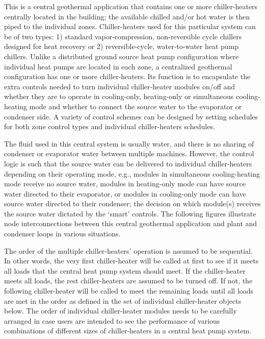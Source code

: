 This is a central geothermal application that contains one or more chiller-heaters centrally located in the building; the available chilled and/or hot water is then piped to the individual zones. Chiller-heaters used for this particular system can be of two types: 1) standard vapor-compression, non-reversible cycle chillers designed for heat recovery or 2) reversible-cycle, water-to-water heat pump chillers. Unlike a distributed ground source heat pump configuration where individual heat pumps are located in each zone, a centralized geothermal configuration has one or more chiller-heaters. Its function is to encapsulate the extra controls needed to turn individual chiller-heater modules on/off and whether they are to operate in cooling-only, heating-only or simultaneous cooling-heating mode and whether to connect the source water to the evaporator or condenser side. A variety of control schemes can be designed by setting schedules for both zone control types and individual chiller-heaters schedules.

The fluid used in this central system is usually water, and there is no sharing of condenser or evaporator water between multiple machines. However, the control logic is such that the source water can be delivered to individual chiller-heaters depending on their operating mode, e.g., modules in simultaneous cooling-heating mode receive no source water, modules in heating-only mode can have source water directed to their evaporator, or modules in cooling-only mode can have source water directed to their condenser; the decision on which module(s) receives the source water dictated by the `smart' controls. The following figures illustrate node interconnections between this central geothermal application and plant and condenser loops in various situations.

The order of the multiple chiller-heaters' operation is assumed to be sequential. In other words, the very first chiller-heater will be called at first to see if it meets all loads that the central heat pump system should meet. If the chiller-heater meets all loads, the rest chiller-heaters are assumed to be turned off. If not, the following chiller-heater will be called to meet the remaining loads until all loads are met in the order as defined in the set of individual chiller-heater objects below. The order of individual chiller-heater modules needs to be carefully arranged in case users are intended to see the performance of various combinations of different sizes of chiller-heaters in a central heat pump system.


